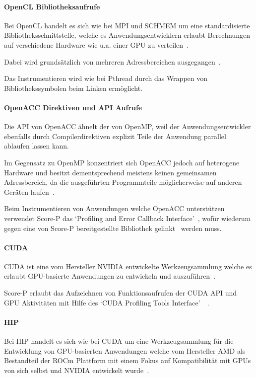 \documentclass[german,proseminar,hyperref,utf8]{zihpub}
\begin{document}
    \paragraph{OpenCL Bibliotheksaufrufe}
    Bei OpenCL handelt es sich wie bei MPI und SCHMEM um eine standardisierte Bibliotheksschnittstelle,
    welche es Anwendungsentwicklern erlaubt Berechnungen auf verschiedene Hardware wie u.a. einer GPU
    zu verteilen~.
    
    Dabei wird grundsätzlich von mehreren Adressbereichen ausgegangen~.

    Das Instrumentieren wird wie bei Pthread durch das Wrappen von Bibliothekssymbolen beim
    Linken ermöglicht.

    \paragraph{OpenACC Direktiven und API Aufrufe}
    Die API von OpenACC ähnelt der von OpenMP, weil der Anwendungsentwickler ebenfalls durch
    Compilerdirektiven explizit Teile der Anwendung parallel ablaufen lassen kann.

    Im Gegensatz zu OpenMP konzentriert sich OpenACC jedoch auf heterogene Hardware und besitzt
    dementsprechend meistens keinen gemeinsamen Adressbereich, da die ausgeführten Programmteile
    möglicherweise auf anderen Geräten laufen~.

    Beim Instrumentieren von Anwendungen welche OpenACC unterstützen verwendet Score-P das
    `Profiling and Error Callback Interface'~, wofür wiederum gegen eine
    von Score-P bereitgestellte Bibliothek gelinkt~
    werden muss.

    \paragraph{CUDA}
    CUDA ist eine vom Hersteller NVIDIA entwickelte Werkzeugsammlung welche es erlaubt GPU-basierte
    Anwendungen zu entwickeln und auszuführen~.

    Score-P erlaubt das Aufzeichnen von Funktionsaufrufen der CUDA API und GPU Aktivitäten mit Hilfe des
    `CUDA Profiling Tools Interface'~~.

    \paragraph{HIP}
    Bei HIP handelt es sich wie bei CUDA um eine Werkzeugsammlung für die Entwicklung von GPU-basierten
    Anwendungen welche vom Hersteller AMD als Bestandteil der ROCm Plattform mit einem Fokus auf
    Kompatibilität mit GPUs von sich selbst und NVIDIA entwickelt wurde~.
\end{document}
